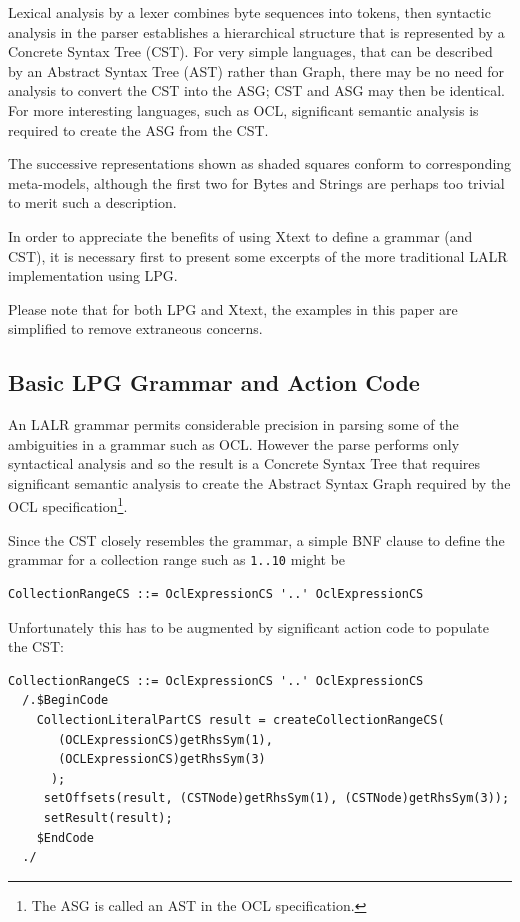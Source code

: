 \documentclass[runningheads,a4paper]{llncs}
\begin{document}
Lexical analysis by a lexer combines byte sequences into tokens, then syntactic analysis in the parser establishes a hierarchical structure that is represented by a Concrete Syntax Tree (CST). For very simple languages, that can be described by an Abstract Syntax Tree (AST) rather than Graph, there may be no need for analysis to convert the CST into the ASG; CST and ASG may then be identical.  For more interesting languages, such as OCL, significant semantic analysis is required to create the ASG from the CST.

The successive representations shown as shaded squares conform to corresponding meta-models, although the first two for Bytes and Strings are perhaps too trivial to merit such a description. 

In order to appreciate the benefits of using Xtext to define a grammar (and CST), it is necessary first to present some excerpts of the more traditional LALR\cite{dragon} implementation using LPG\cite{LPG}.

Please note that for both LPG and Xtext, the examples in this paper are simplified to remove extraneous concerns.

\subsection{Basic LPG Grammar and Action Code}

An LALR grammar permits considerable precision in parsing some of the ambiguities in a grammar such as OCL. However the parse performs only syntactical analysis and so the result is a Concrete Syntax Tree that requires significant semantic analysis to create the Abstract Syntax Graph required by the OCL specification\footnote{The ASG is called an AST in the OCL specification.}.

Since the CST closely resembles the grammar, a simple BNF\cite{dragon} clause to define the grammar for a collection range such as \verb+1..10+ might be

{\small\begin{verbatim}
CollectionRangeCS ::= OclExpressionCS '..' OclExpressionCS
\end{verbatim}}

Unfortunately this has to be augmented by significant action code to populate the CST:

{\small\begin{verbatim}
CollectionRangeCS ::= OclExpressionCS '..' OclExpressionCS
  /.$BeginCode
    CollectionLiteralPartCS result = createCollectionRangeCS(
       (OCLExpressionCS)getRhsSym(1),
       (OCLExpressionCS)getRhsSym(3)
      );
     setOffsets(result, (CSTNode)getRhsSym(1), (CSTNode)getRhsSym(3));
     setResult(result);
    $EndCode
  ./
\end{verbatim}}
\end{document}
